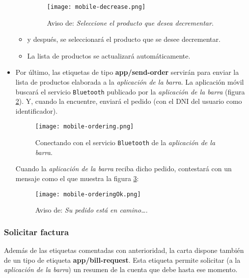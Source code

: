 \begin{itemize}
\begin{itemize}
  \begin{figure}[H]
    \begin{center}
      \texttt{[image: mobile-decrease.png]}
      \caption{Aviso de: \emph{Seleccione el producto que desea decrementar}.}
      \label{fig:mobile-decrease}
    \end{center}
  \end{figure}

  \item y después, se seleccionará el producto que se desee decrementar.
  \item La lista de productos se actualizará automáticamente.
  \end{itemize}

\item Por último, las etiquetas de tipo \textbf{app/send-order} servirán
para enviar la lista de productos elaborada a la \emph{aplicación de la barra}.
La aplicación móvil buscará el servicio \texttt{Bluetooth} publicado por la
\emph{aplicación de la barra} (figura \ref{fig:mobile-ordering}). Y, cuando la 
encuentre, enviará el pedido (con el DNI del usuario como identificador).

  \begin{figure}[H]
    \begin{center}
      \texttt{[image: mobile-ordering.png]}
      \caption{Conectando con el servicio \texttt{Bluetooth} de la
      \emph{aplicación de la barra}.}
      \label{fig:mobile-ordering}
    \end{center}
  \end{figure}

Cuando la \emph{aplicación de la barra} reciba dicho pedido, contestará con
un mensaje como el que muestra la figura \ref{fig:mobile-orderingOk}:

  \begin{figure}[H]
    \begin{center}
      \texttt{[image: mobile-orderingOk.png]}
      \caption{Aviso de: \emph{Su pedido está en camino\dots}.}
      \label{fig:mobile-orderingOk}
    \end{center}
  \end{figure}

\end{itemize}

\subsubsection{Solicitar factura}
Además de las etiquetas comentadas con anterioridad, la carta dispone también
de un tipo de etiqueta \textbf{app/bill-request}. Esta etiqueta permite 
solicitar (a la \emph{aplicación de la barra}) un resumen de la cuenta que
debe hasta ese momento.

